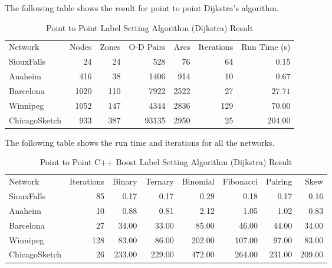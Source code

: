 The following table shows the result for point to point Dijkstra's algorithm.
\begin{table}[H]
    \centering
    \begin{tabular}{lrrrrrr}
        Network & Nodes & Zones & O-D Pairs & Arcs  & Iterations & Run Time (s) \\
        SiouxFalls    & 24   & 24  & 528   & 76     & 64         & $ 0.15 $     \\
        Anaheim       & 416  & 38  & 1406  & 914    & 10         & $ 0.67 $     \\
        Barcelona     & 1020 & 110 & 7922  & 2522   & 27         & $ 27.71$     \\
        Winnipeg      & 1052 & 147 & 4344  & 2836   & 129        & $ 70.00  $   \\
        ChicagoSketch & 933  & 387 & 93135 & 2950   & 25         & $ 204.00  $ 
    \end{tabular}
    \caption{Point to Point Label Setting Algorithm (Dijkstra) Result}
\end{table}

The following table shows the run time and iterations for all the networks.
\begin{table}[H]
    \centering
    \begin{tabular}{lrrrrrrr}
        Network       & Iterations & Binary & Ternary & Binomial & Fibonacci & Pairing & Skew \\
        SiouxFalls    & 85         & 0.17 & 0.17 & 0.29 & 0.18 & 0.17 & 0.16                  \\
        Anaheim       & 10         & 0.88 & 0.81 & 2.12  & 1.05 & 1.02 & 0.83                 \\
        Barcelona     & 27         & 34.00 & 33.00 & 85.00 & 46.00 & 44.00 & 34.00            \\
        Winnipeg      & 128        & 83.00 & 86.00 & 202.00 & 107.00 & 97.00 & 83.00          \\
        ChicagoSketch & 26         & 233.00 & 229.00 & 472.00 & 264.00 & 231.00 & 209.00      
    \end{tabular}
    \caption{Point to Point C++ Boost Label Setting Algorithm (Dijkstra) Result}
    \label{table:dijkstraresult}
\end{table}

